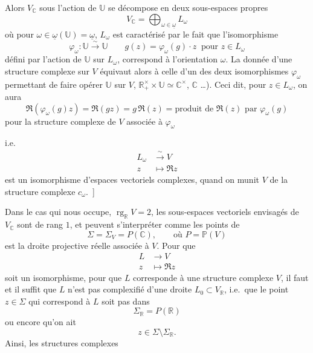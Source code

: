\documentclass[11pt,a4paper]{article}
\begin{document}
Alors $V_{\mathbb{C}}$ sous l'action de $\mathbb{U}$ se décompose en deux sous-espaces propres
\[
  V_{\mathbb{C}} = \bigoplus_{\omega \in \underline{\omega}} L_\omega \tag{14}
\]
où pour $\omega \in \underline{\omega}(\mathbb{U}) = \underline{\omega}$, $L_\omega$ est caractérisé par
le fait que l'isomorphisme
\[
  \varphi_\omega : \mathbb{U} \xrightarrow{\;\sim\;} \mathbb{U} \qquad
  g(z) = \varphi_\omega(g)\cdot z \ \text{ pour } z \in L_\omega \tag{15}
\]
défini par l'action de $\mathbb{U}$ sur $L_\omega$, correspond à l'orientation $\omega$.
La donnée d'une structure complexe sur $V$  équivaut alors à celle
d'un des deux isomorphismes $\varphi_\omega$ permettant de faire opérer $\mathbb{U}$ sur $V$,
 $\mathbb{R}^{\times}_{+} \times \mathbb{U} \simeq \mathbb{C}^{\times}$,
\struck{\ill{}} $\mathbb{C}$ \ldots). Ceci dit, pour \struck{\ill{}} $z \in L_\omega$, on aura
\[
  \Re(\varphi_\omega(g) z) = \Re(g z) = g\, \Re(z) = \text{produit de } \Re(z) \text{ par } \varphi_\omega(g)
\]
pour la structure complexe de $V$ associée à $\varphi_\omega$

i.e.
\[
  \begin{aligned}
    L_\omega &\xrightarrow{\;\sim\;} V \\
    z &\longmapsto \Re z
  \end{aligned}
\]
est un isomorphisme d'espaces vectoriels complexes, quand on munit $V$ de la structure
complexe $c_\omega$.~]

Dans le cas qui nous occupe, $\operatorname{rg}_{\mathbb{R}} V = 2$, les 
sous-espaces vectoriels envisagés de $V_{\mathbb{C}}$ sont de \struck{\ill{}} rang $1$,
 et peuvent s'interpréter comme les points de
\[
  \Sigma = \Sigma_V = P(\mathbb{C}), \qquad \text{où } P = \mathbb{P}(V) \tag{16}
\]
est la  droite projective réelle associée à $V$. Pour que
\[
  \begin{aligned}
    L &\longrightarrow V \\
    z &\longmapsto \Re z
  \end{aligned}
\]
soit un isomorphisme,  pour que $L$ corresponde à une structure complexe
  $V$,  il faut et il suffit que
 $L$ n'est pas
complexifié d'une droite $L_0 \subset V_{\mathbb{R}}$, i.e.\ que le point $z \in \Sigma$ qui
correspond à $L$  soit pas dans 
\[
  \Sigma_{\mathbb{R}} = P(\mathbb{R})
\]
ou encore qu'on ait
\[
  z \in \Sigma \setminus \Sigma_{\mathbb{R}} . \tag{17}
\]
 Ainsi, les structures complexes
\end{document}
